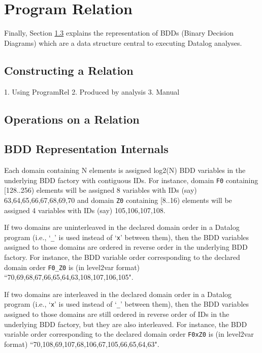 \chapter{Program Relation}
\label{chap:relation}

Finally, Section \ref{sec:bdd} explains the
representation of BDDs (Binary Decision Diagrams) which are a data structure
central to executing Datalog analyses.

\section{Constructing a Relation}

1. Using ProgramRel
2. Produced by analysis
3. Manual

\section{Operations on a Relation}

\section{BDD Representation Internals}
\label{sec:bdd}

Each domain containing N elements is assigned log2(N) BDD variables in the
underlying BDD factory with contiguous IDs.
For instance,
domain {\tt F0} containing [128..256) elements will be assigned 8 variables with
IDs (say) 63,64,65,66,67,68,69,70 and
domain {\tt Z0} containing [8..16) elements will be assigned 4 variables with
IDs (say) 105,106,107,108.

If two domains are uninterleaved in the declared domain order in a Datalog
program (i.e., `{\tt \_}' is used instead of `{\tt x}' between them),
then the BDD variables assigned to those domains are ordered in reverse order in
the underlying BDD factory.
For instance, the BDD variable order corresponding to the declared domain order
{\tt F0\_Z0} is (in level2var format)
``70,69,68,67,66,65,64,63,108,107,106,105".

If two domains are interleaved in the declared domain order in a Datalog program
(i.e., `{\tt x}' is used instead of `{\tt \_}' between them),
then the BDD variables assigned to those domains are still ordered in reverse
order of IDs in the underlying BDD factory,
but they are also interleaved.
For instance, the BDD variable order corresponding to the declared domain order
{\tt F0xZ0} is (in level2var format)
``70,108,69,107,68,106,67,105,66,65,64,63".

